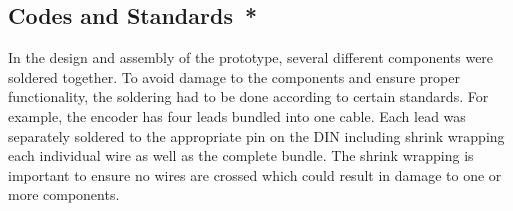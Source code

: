 \subsection*{Codes and Standards{{\color{red}\ *}}}
In the design and assembly of the prototype, several different components were soldered together. To avoid damage to the components and ensure proper functionality, the soldering had to be done according to certain standards. For example, the encoder has four leads bundled into one cable. Each lead was separately soldered to the appropriate pin on the DIN including shrink wrapping each individual wire as well as the complete bundle. The shrink wrapping is important to ensure no wires are crossed which could result in damage to one or more components. 